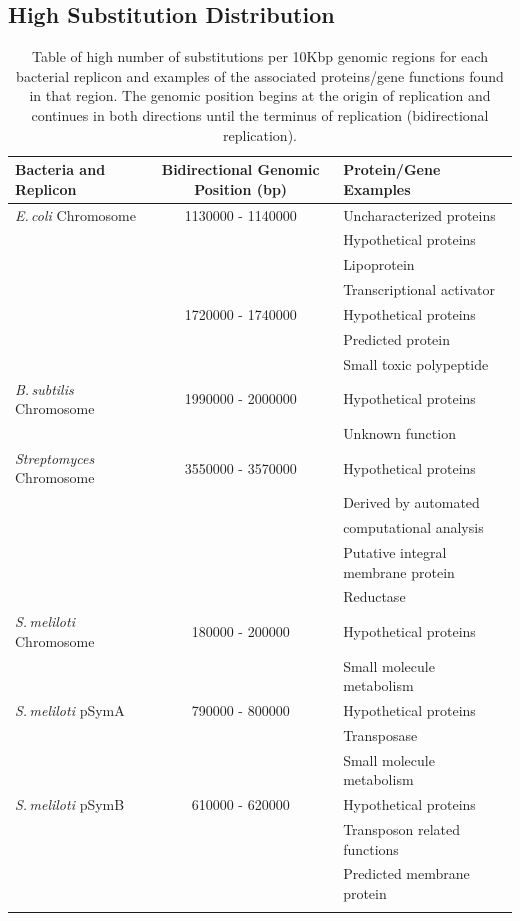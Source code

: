 \documentclass[11pt]{article}
\newcommand{\smel}{\textit{S.\,meliloti}\xspace}
\newcommand{\strep}{\textit{Streptomyces}\xspace}
\newcommand{\ecol}{\textit{E.\,coli}\xspace}
\newcommand{\bass}{\textit{B.\,subtilis}\xspace}
\newcommand{\pa}{pSymA\xspace}
\newcommand{\pb}{pSymB\xspace}
\begin{document}
\subsection{High Substitution Distribution}
\begin{longtable}{lcl}
	\hline
	Bacteria and Replicon & Bidirectional Genomic Position (bp) & Protein/Gene Examples \\ \hline
	\ecol Chromosome & 1130000 - 1140000 & Uncharacterized proteins\\
	& & Hypothetical proteins\\
	& & Lipoprotein\\ 
	& & Transcriptional activator\\ 
	& 1720000 - 1740000 & Hypothetical proteins\\
	& & Predicted protein\\
	& & Small toxic polypeptide\\ \hline
	\bass Chromosome & 1990000 - 2000000 & Hypothetical proteins\\
	& & Unknown function\\ \hline
	\strep Chromosome & 3550000 - 3570000 & Hypothetical proteins\\
	& & Derived by automated\\
	&  & computational analysis\\
	& & Putative integral membrane protein\\
	& & Reductase \\ \hline
	\smel Chromosome & 180000 - 200000 & Hypothetical proteins\\
    & & Small molecule metabolism\\	\hline
	\smel \pa & 790000 - 800000 & Hypothetical proteins\\
	& & Transposase \\
	& & Small molecule metabolism \\ \hline
	\smel \pb & 610000 - 620000 & Hypothetical proteins\\
	& & Transposon related functions\\
	& & Predicted membrane protein\\ \hline
	\caption{\label{tab:high_sub_bars} Table of high number of substitutions per 10Kbp genomic regions for each bacterial replicon and examples of the associated proteins/gene functions found in that region. The genomic position begins at the origin of replication and continues in both directions until the terminus of replication (bidirectional replication).}
\end{longtable}
\end{document}
